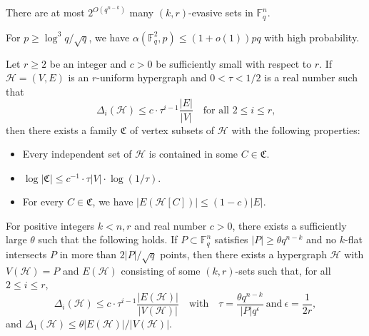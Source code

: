 \documentclass[10pt,a4paper]{amsart}
\begin{document}
\begin{theorem}\label{counting}
    There are at most $2^{O(q^{n-k})}$ many $(k,r)$-evasive sets in $\mathbb{F}^n_q$.
\end{theorem}

\begin{proposition}\label{no-three-in-line_key}
For $p \geq \log^3 q /\sqrt{q}$, we have $\alpha(\mathbb{F}^2_q,p) \leq (1+o(1))pq$ with high probability.
\end{proposition}

\begin{lemma}\label{HCL}
Let $r \ge 2$ be an integer and $c>0$ be sufficiently small with respect to $r$. If $\mathcal{H}=(V,E)$ is an $r$-uniform hypergraph and $0<\tau<1/2$ is a real number such that \begin{equation*}
        \Delta_i(\mathcal{H}) \leq c \cdot \tau^{i-1} \frac{|E|}{|V|} \quad\text{for all $2\leq i\leq r$,}
\end{equation*} then there exists a family $\mathfrak{C}$ of vertex subsets of $\mathcal{H}$ with the following properties:
\begin{itemize}
            \item[(a)] Every independent set of $\mathcal{H}$ is contained in some $C \in \mathfrak{C}$.
            \item[(b)] $\log |\mathfrak{C}| \leq c^{-1} \cdot \tau |V| \cdot \log(1/\tau)$.
            \item[(c)] For every $C \in \mathfrak{C}$, we have $|E(\mathcal{H}[C])| \leq (1 - c)|E|$.
\end{itemize}
\end{lemma}

\begin{lemma}\label{counting_supersaturation}
    For positive integers $k < n, r$ and real number $c > 0$, there exists a sufficiently large $\theta$ such that the following holds. If $P \subset \mathbb{F}_q^{n}$ satisfies $ |P| \geq \theta q^{n-k}$ and no $k$-flat intersects $P$ in more than $2|P|/\sqrt{q}$ points, then there exists a hypergraph $\mathcal{H}$ with $V(\mathcal{H}) = P$ and $E(\mathcal{H})$ consisting of some $(k,r)$-sets such that, for all $2\leq i\leq r$, \begin{equation*}
        \Delta_i(\mathcal{H}) \leq c \cdot \tau^{i-1} \frac{|E(\mathcal{H})|}{|V(\mathcal{H})|} \quad\text{with}\quad \tau = \frac{\theta q^{n-k}}{|P|q^\epsilon} ~\text{and}~ \epsilon = \frac{1}{2r},
    \end{equation*} and $\Delta_1(\mathcal{H})\leq \theta |E(\mathcal{H})|/|V(\mathcal{H})|$.
\end{lemma}
\end{document}
